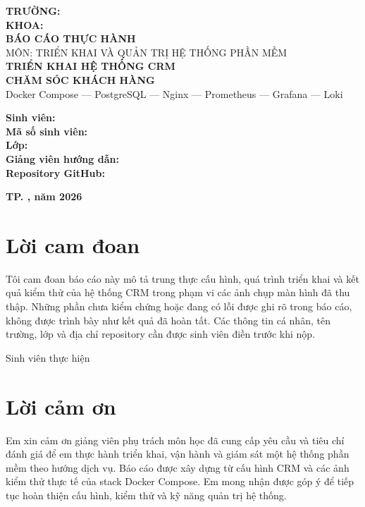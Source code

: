 \documentclass[12pt,a4paper]{report}
\newcommand{\fillline}[1]{\underline{\hspace{#1}}}
\begin{document}
\begin{titlepage}
\centering
{\large \textbf{TRƯỜNG: \fillline{7cm}}}\\[0.4cm]
{\large \textbf{KHOA: \fillline{7.8cm}}}\\[2.0cm]
{\Large \textbf{BÁO CÁO THỰC HÀNH}}\\[0.5cm]
{\large MÔN: TRIỂN KHAI VÀ QUẢN TRỊ HỆ THỐNG PHẦN MỀM}\\[1.5cm]
{\LARGE\bfseries TRIỂN KHAI HỆ THỐNG CRM\\CHĂM SÓC KHÁCH HÀNG}\\[0.4cm]
{\large Docker Compose — PostgreSQL — Nginx — Prometheus — Grafana — Loki}\\[1.8cm]
\begin{flushleft}
\textbf{Sinh viên:} \fillline{10cm}\\[0.45cm]
\textbf{Mã số sinh viên:} \fillline{8.7cm}\\[0.45cm]
\textbf{Lớp:} \fillline{11.3cm}\\[0.45cm]
\textbf{Giảng viên hướng dẫn:} \fillline{7.6cm}\\[0.45cm]
\textbf{Repository GitHub:} \fillline{7.3cm}
\end{flushleft}
\vfill
{\large \textbf{TP. \fillline{3cm}, năm 2026}}
\end{titlepage}

\chapter*{Lời cam đoan}
Tôi cam đoan báo cáo này mô tả trung thực cấu hình, quá trình triển khai và kết quả kiểm thử của hệ thống CRM trong phạm vi các ảnh chụp màn hình đã thu thập. Những phần chưa kiểm chứng hoặc đang có lỗi được ghi rõ trong báo cáo, không được trình bày như kết quả đã hoàn tất. Các thông tin cá nhân, tên trường, lớp và địa chỉ repository cần được sinh viên điền trước khi nộp.\\[1cm]
\begin{flushright}
Sinh viên thực hiện\\[1.5cm]
\fillline{5cm}
\end{flushright}

\chapter*{Lời cảm ơn}
Em xin cảm ơn giảng viên phụ trách môn học đã cung cấp yêu cầu và tiêu chí đánh giá để em thực hành triển khai, vận hành và giám sát một hệ thống phần mềm theo hướng dịch vụ. Báo cáo được xây dựng từ cấu hình CRM và các ảnh kiểm thử thực tế của stack Docker Compose. Em mong nhận được góp ý để tiếp tục hoàn thiện cấu hình, kiểm thử và kỹ năng quản trị hệ thống.
\end{document}
